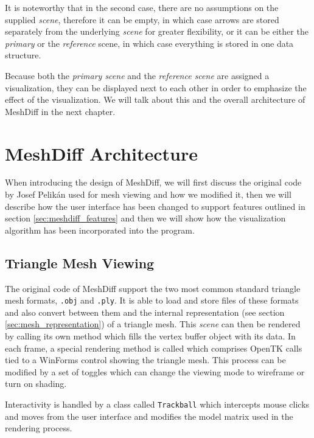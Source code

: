 It is noteworthy that in the second case, there are no assumptions on the supplied {\it scene}, therefore it can be empty, in which case arrows are stored separately from the underlying {\it scene} for greater flexibility, or it can be either the {\it primary} or the {\it reference} scene, in which case everything is stored in one data structure.

Because both the {\it primary scene} and the {\it reference scene} are assigned a visualization, they can be displayed next to each other in order to emphasize the effect of the visualization. We will talk about this and the overall architecture of MeshDiff in the next chapter.
\section{MeshDiff Architecture}

When introducing the design of MeshDiff, we will first discuss the original code by Josef Pelikán used for mesh viewing and how we modified it, then we will describe how the user interface has been changed to support features outlined in section \ref{sec:meshdiff_features} and then we will show how the visualization algorithm has been incorporated into the program.

\subsection{Triangle Mesh Viewing}

The original code of MeshDiff support the two most common standard triangle mesh formats, \verb+.obj+ and \verb+.ply+. It is able to load and store files of these formats and also convert between them and the internal representation (see section \ref{sec:mesh_representation}) of a triangle mesh. This {\it scene} can then be rendered by calling its own method which fills the vertex buffer object with its data. In each frame, a special rendering method is called which comprises OpenTK calls tied to a WinForms control showing the triangle mesh. This process can be modified by a set of toggles which can change the viewing mode to wireframe or turn on shading.

Interactivity is handled by a class called \verb+Trackball+ which intercepts mouse clicks and moves from the user interface and modifies the model matrix used in the rendering process.

